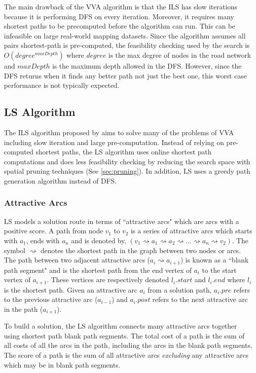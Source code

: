 \documentclass[honors]{union-cs-thesis}
\newcommand{\spa}{\rightsquigarrow}
\begin{document}
The main drawback of the VVA algorithm is that the ILS has slow iterations because it is performing DFS on every iteration.  Moreover, it requires many shortest paths to be precomputed before the algorithm can run. This can be infeasible on large real-world  mapping datasets. Since the algorithm assumes all pairs shortest-path is pre-computed, the feasibility checking used by the search is $O(degree^{maxDepth})$ where $degree$ is the max degree of nodes in the road network and $maxDepth$ is the maximum depth allowed in the DFS. However, since the DFS returns when it finds any better path not just the best one, this worst case performance is not typically expected.

\subsection{LS Algorithm}
\label{sec:ls-algo}
The ILS algorithm proposed by \citeauthor{lu2015arc} aims to solve many of the problems of VVA including slow iteration and large pre-computation. Instead of relying on pre-computed shortest paths, the LS algorithm uses online shortest path computations and does less feasibility checking by reducing the search space with spatial pruning techniques (See \cref{sec:pruning}). In addition, LS uses a greedy path generation algorithm instead of DFS.

\subsubsection{Attractive Arcs}
LS models a solution route in terms of ``attractive arcs" which are arcs with a positive score. A path from node $v_1$ to $v_2$ is a series of attractive arcs which starts with $a_1$, ends with $a_n$ and is denoted by, $(v_1 \spa a_1 \spa a_2 \spa \ldots \spa a_n \spa v_2)$. The symbol $\spa$ denotes the shortest path in the graph between two nodes or arcs. The path between two adjacent attractive arcs ($a_i \spa  a_{i+1}$) is known as a ``blank path segment" and is the shortest path from the end vertex of $a_i$ to the start vertex of $a_{i+1}$. These vertices are respectively denoted $l_i.start$ and $l_i.end$ where $l_i$ is the shortest path. Given an attractive arc $a_i$ from a solution path, $a_i.pre$ refers to the previous attractive arc ($a_{i-1}$) and $a_i.post$ refers to the next attractive arc in the path ($a_{i+1}$). 

To build a solution, the LS algorithm connects many attractive arcs together using shortest path blank path segments. The total cost of a path is the sum of all costs of all the arcs in the path, including the arcs in the blank path segments. The score of a path is the sum of all attractive arcs \emph{excluding} any attractive arcs which may be in blank path segments.
\end{document}

